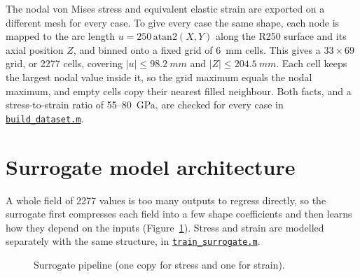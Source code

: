 \documentclass[11pt,a4paper]{article}
\newcommand{\repo}{https://github.com/Shass27/curiosity-perseverance-wheel-fea}
\newcommand{\blob}{\repo/blob/main}
\begin{document}
The nodal von Mises stress and equivalent elastic strain are exported on a different mesh for every case. To give every case the same shape, each node is mapped to the arc length $u = 250\,\text{atan2}(X, Y)$ along the R250 surface and its axial position $Z$, and binned onto a fixed grid of \SI{6}{mm} cells. This gives a $33 \times 69$ grid, or 2277 cells, covering $|u| \le \SI{98.2}{mm}$ and $|Z| \le \SI{204.5}{mm}$. Each cell keeps the largest nodal value inside it, so the grid maximum equals the nodal maximum, and empty cells copy their nearest filled neighbour. Both facts, and a stress-to-strain ratio of 55--\SI{80}{GPa}, are checked for every case in \href{\blob/scripts\%20and\%20outputs/tier_3/build_dataset.m}{\texttt{build\_dataset.m}}.

\section{Surrogate model architecture}
\label{sec:arch}

A whole field of 2277 values is too many outputs to regress directly, so the surrogate first compresses each field into a few shape coefficients and then learns how they depend on the inputs (Figure~\ref{fig:pipeline}). Stress and strain are modelled separately with the same structure, in \href{\blob/scripts\%20and\%20outputs/tier_3/train_surrogate.m}{\texttt{train\_surrogate.m}}.

\begin{figure}[!htb]
  \centering
  \caption{Surrogate pipeline (one copy for stress and one for strain).}
  \label{fig:pipeline}
\end{figure}
\end{document}
